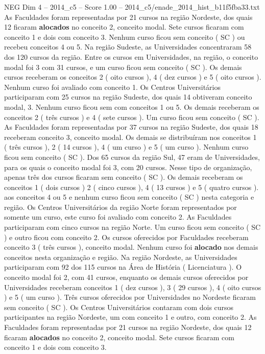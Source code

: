 \begin{textsample}{NEG Dim 4 – 2014\_c5 – Score 1.00 – 2014\_c5/enade\_2014\_hist\_b11f5fba33.txt}
As Faculdades foram representadas por 21 cursos na região Nordeste, dos quais 12 ficaram \textbf{alocados} no conceito 2, conceito modal.
Sete cursos ficaram com conceito 1 e dois com conceito 3.
Nenhum curso ficou sem conceito ( SC ) ou recebeu conceitos 4 ou 5.
Na região Sudeste, as Universidades concentraram 58 dos 120 cursos da região.
Entre os cursos em Universidades, na região, o conceito modal foi 3 com 31 cursos, e um curso ficou sem conceito ( SC ).
Os demais cursos receberam os conceitos 2 ( oito cursos ), 4 ( dez cursos ) e 5 ( oito cursos ).
Nenhum curso foi avaliado com conceito 1.
Os Centros Universitários participaram com 25 cursos na região Sudeste, dos quais 14 obtiveram conceito modal, 3.
Nenhum curso ficou sem com conceitos 1 ou 5.
Os demais receberam os conceitos 2 ( três cursos ) e 4 ( sete cursos ).
Um curso ficou sem conceito ( SC ).
As Faculdades foram representadas por 37 cursos na região Sudeste, dos quais 18 receberam conceito 3, conceito modal.
Os demais se distribuíram nos conceitos 1 ( três cursos ), 2 ( 14 cursos ), 4 ( um curso ) e 5 ( um curso ).
Nenhum curso ficou sem conceito ( SC ).
Dos 65 cursos da região Sul, 47 eram de Universidades, para os quais o conceito modal foi 3, com 20 cursos.
Nesse tipo de organização, apenas três dos cursos ficaram sem conceito ( SC ).
Os demais receberam os conceitos 1 ( dois cursos ) 2 ( cinco cursos ), 4 ( 13 cursos ) e 5 ( quatro cursos ). aos conceitos 4 ou 5 e nenhum curso ficou sem conceito ( SC ) nesta categoria e região.
Os Centros Universitários da região Norte foram representados por somente um curso, este curso foi avaliado com conceito 2.
As Faculdades participaram com cinco cursos na região Norte.
Um curso ficou sem conceito ( SC ) e outro ficou com conceito 2.
Os cursos oferecidos por Faculdades receberam conceito 3 ( três cursos ), conceito modal.
Nenhum curso foi \textbf{alocado} nos demais conceitos nesta organização e região.
Na região Nordeste, as Universidades participaram com 92 dos 115 cursos na Área de História ( Licenciatura ).
O conceito modal foi 2, com 41 cursos, enquanto os demais cursos oferecidos por Universidades receberam conceitos 1 ( dez cursos ), 3 ( 29 cursos ), 4 ( oito cursos ) e 5 ( um curso ).
Três cursos oferecidos por Universidades no Nordeste ficaram sem conceito ( SC ).
Os Centros Universitários contaram com dois cursos participantes na região Nordeste, um com conceito 1 e outro, com conceito 2.
As Faculdades foram representadas por 21 cursos na região Nordeste, dos quais 12 ficaram \textbf{alocados} no conceito 2, conceito modal.
Sete cursos ficaram com conceito 1 e dois com conceito 3.

\end{textsample}
